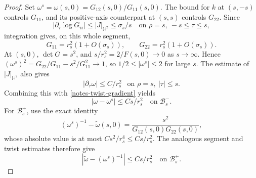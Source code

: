 \documentclass[letterpaper]{amsart}
\theoremstyle{definition}
\theoremstyle{remark}
\begin{document}
\begin{proof}
Set $\omega^s=\omega(s,0)=G_{12}(s,0)/G_{11}(s,0)$.
The bound for $k$ at $(s,-s)$ controls $G_{11}$, and its positive-axis
counterpart at $(s,s)$ controls $G_{22}$. Since
\[
 |\partial_\tau\log G_{ii}|\le |J|_{\mathbb H^2}\le\sigma_s/s
 \quad\text{on }\rho=s,\ -s\le\tau\le s,
\]
integration gives, on this whole segment,
\[
 G_{11}=r_s^2(1+O(\sigma_s)),\qquad
 G_{22}=r_s^2(1+O(\sigma_s)).
\]
At $(s,0)$, $\det G=s^2$, and $s/r_s^2=2/F(s,0)\to0$ as $s\to \infty$. Hence
$(\omega^s)^2=G_{22}/G_{11}-s^2/G_{11}^2\to1$, so
$1/2\le|\omega^s|\le2$ for large $s$.
The estimate of $|J|_{\mathbb{H}^2}$ also gives 
$$|\partial_\tau\omega|\le C/r_s^2\ \  \text{ on } \rho =s,\ |\tau | \leq s.$$
Combining this with \eqref{notes-twist-gradient} yields
\begin{equation}\label{notes-twist-match}
 |\omega-\omega^s|\le Cs/r_s^2
 \quad\text{on }\mathcal B_s^-.
\end{equation}
For $\mathcal B_s^+$, use the exact identity
\[
 (\omega^s)^{-1}-\widetilde\omega(s,0)
 =\frac{s^2}{G_{12}(s,0)G_{22}(s,0)},
\]
whose absolute value is at most $Cs^2/r_s^4\le Cs/r_s^2$.
The analogous segment and twist estimates therefore give
\begin{equation}\label{notes-twist-match-second}
 |\widetilde\omega-(\omega^s)^{-1}|\le Cs/r_s^2
 \quad\text{on }\mathcal B_s^+.
\end{equation}


\end{proof}
\end{document}
